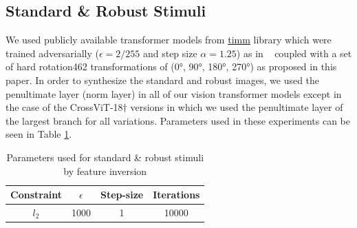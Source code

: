 \documentclass{article} %
\begin{document}
\subsection{Standard \& Robust Stimuli}

We used publicly available transformer models from \href{https://github.com/rwightman/pytorch-image-models}{timm} library which were trained adversarially ($\epsilon = 2/255$ and step size $\alpha = 1.25$) as in ~\citep{wong2020fast} coupled with a set of hard rotation462 transformations of (0°, 90°, 180°, 270°) as proposed in this paper. In order to synthesize the standard and robust images, we used the penultimate layer (norm layer) in all of our vision transformer models except in the case of the CrossViT-18$\dagger$ versions in which we used the penultimate layer of the largest branch for all variations. Parameters used in these experiments can be seen in Table \ref{table:parameters_inversion}.

\begin{table}[h!]
\centering
\begin{tabular}{cccc}\\\toprule  
Constraint& $\epsilon$ & Step-size & Iterations \\\midrule  
$l_{2}$
&1000 & 1 & 10000\\ \bottomrule
\end{tabular}
 \vspace{4pt}
\caption{Parameters used for standard \& robust stimuli by feature inversion}
\label{table:parameters_inversion}
\end{table}





\end{document}

